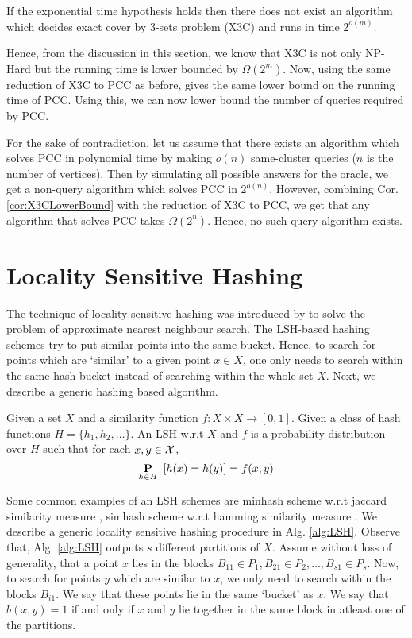 \begin{corollary}
\label{cor:X3CLowerBound}
If the exponential time hypothesis holds then there does not exist an algorithm which decides exact cover by 3-sets problem (X3C) and runs in time $2^{o(m)}$.
\end{corollary}

Hence, from the discussion in this section, we know that X3C is not only NP-Hard but the running time is lower bounded by $\Omega(2^m)$. Now, using the same reduction of X3C to PCC as before, gives the same lower bound on the running time of PCC. Using this, we can now lower bound the number of queries required by PCC.

For the sake of contradiction, let us assume that there exists an algorithm which solves PCC in polynomial time by making $o(n)$ same-cluster queries ($n$ is the number of vertices). Then by simulating all possible answers for the oracle, we get a non-query algorithm which solves PCC in $2^{o(n)}$. However, combining Cor. \ref{cor:X3CLowerBound} with the reduction of X3C to PCC, we get that any algorithm that solves PCC takes $\Omega(2^n)$. Hence, no such query algorithm exists. 

\section{Locality Sensitive Hashing}
\label{section:A-LSH}
The technique of locality sensitive hashing was introduced by \cite{gionis1999similarity} to solve the problem of approximate nearest neighbour search. The LSH-based hashing schemes try to put similar points into the same bucket. Hence, to search for points which are `similar' to a given point $x \in X$, one only needs to search within the same hash bucket instead of searching within the whole set $X$. Next, we describe a generic hashing based algorithm. 

\begin{definition}
\label{defn:LSH}
Given a set $X$ and a similarity function $f:X \times X \rightarrow [0, 1]$. Given a class of hash functions $H = \{h_1, h_2, \ldots \}$. An LSH w.r.t $X$ and $f$ is a probability distribution over $H$ such that for each $x, y \in \mathcal X$, $$\underset{h \in H}{\mathbf P}\enspace [h(x) = h(y)] = f(x, y)$$
\end{definition}
\noindent Some common examples of an LSH schemes are minhash scheme w.r.t jaccard similarity measure \cite{broder2000min, broder1997resemblance}, simhash scheme w.r.t hamming similarity measure \cite{charikar2002similarity}. We describe a generic locality sensitive hashing procedure in Alg. \ref{alg:LSH}. Observe that, Alg. \ref{alg:LSH} outputs $s$ different partitions of $X$. Assume without loss of generality, that a point $x$ lies in the blocks $B_{11} \in P_1, B_{21} \in P_2, \ldots, B_{s1} \in P_s$. Now, to search for points $y$ which are similar to $x$, we only need to search within the blocks $B_{i1}$. We say that these points lie in the same `bucket' as $x$. We say that $b(x, y) = 1$ if and only if $x$ and $y$ lie together in the same block in atleast one of the partitions.

